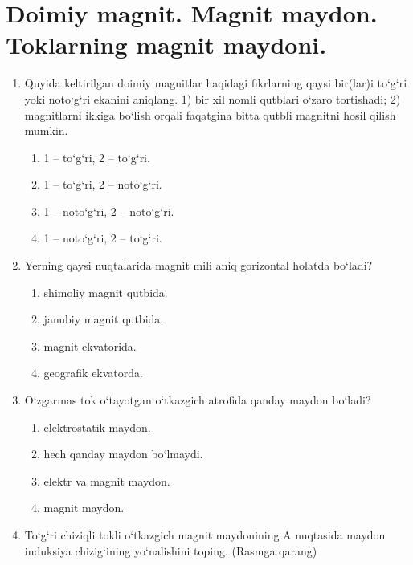 

\section{Doimiy magnit. Magnit maydon. Toklarning magnit maydoni.}


\begin{enumerate}

\item Quyida keltirilgan doimiy magnitlar haqidagi fikrlarning qaysi bir(lar)i to‘g‘ri yoki noto‘g‘ri ekanini aniqlang.
1) bir xil nomli qutblari o‘zaro tortishadi;
2) magnitlarni ikkiga bo‘lish orqali faqatgina bitta qutbli magnitni hosil qilish mumkin.
\begin{enumerate}[label=\Alph*)]
\item 1 – to‘g‘ri, 2 – to‘g‘ri.
\item 1 – to‘g‘ri, 2 – noto‘g‘ri.
\item 1 – noto‘g‘ri, 2 – noto‘g‘ri.
\item 1 – noto‘g‘ri, 2 – to‘g‘ri.
\end{enumerate}


\item Yerning qaysi nuqtalarida magnit mili aniq gorizontal holatda bo‘ladi?
\begin{enumerate}[label=\Alph*)]
\item shimoliy magnit qutbida.
\item janubiy magnit qutbida.
\item magnit ekvatorida.
\item geografik ekvatorda.
\end{enumerate}

\item O‘zgarmas tok o‘tayotgan o‘tkazgich atrofida qanday maydon bo‘ladi?
\begin{enumerate}[label=\Alph*)]
\item elektrostatik maydon.
\item hech qanday maydon bo‘lmaydi.
\item elektr va magnit maydon.
\item magnit maydon.
\end{enumerate}

\item To‘g‘ri chiziqli tokli o‘tkazgich magnit maydonining A nuqtasida maydon induksiya chizig‘ining yo‘nalishini toping. (Rasmga qarang)

\end{enumerate}
